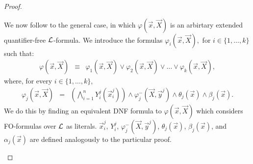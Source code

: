 \documentclass[12pt]{article}
\def\L{{\cal L}}
\def\X{\vec{X}}
\def\x{\vec{x}} %
\def\y{\vec{y}} %
\begin{document}
\begin{proof}
\begin{enumerate}
We now follow to the general case, in which $\varphi(\x,\X)$ is an arbirtary extended quantifier-free $\L$-formula. We introduce the formulas $\varphi_i(\x,\X),$ for $i\in\{1,\dots,k\}$ such that:
\begin{eqnarray*}
\varphi(\x,\X) &\equiv& \varphi_1(\x,\X) \vee \varphi_2(\x,\X) \vee \dots  \vee \varphi_k(\x,\X),
\end{eqnarray*}
where, for every $i\in\{1,\ldots,k\}$,
\begin{eqnarray*}
\varphi_j(\x,\X) &=& \left( \bigwedge_{i=1}^n Y^j_i(\x^j_i) \right) \wedge \varphi^{-}_j(\X,\y^j) \wedge \theta_j(\x) \wedge \beta_j(\x).
\end{eqnarray*}
We do this by finding an equivalent DNF formula to $\varphi(\x,\X)$ which considers FO-formulas over $\L$ as literals. $\x^j_i$, $Y^j_i$, $\varphi^{-}_j(\X,\y^j)$, $\theta_j(\x)$, $\beta_j(\x)$, and $\alpha_j(\x)$ are defined analogously to the particular proof. 


\end{enumerate}
\end{proof}
\end{document}
